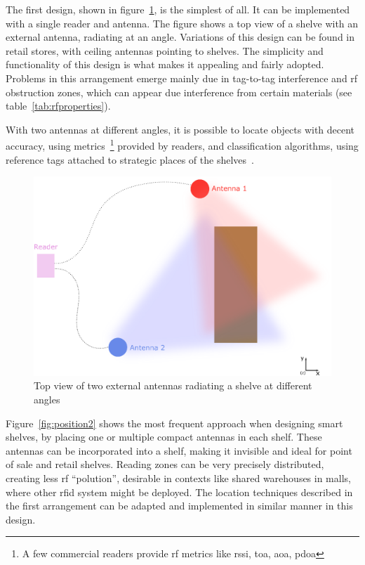 The first design, shown in figure~\ref{fig:position1}, is the simplest of all. It can be implemented with a single reader and antenna. The figure shows a top view of a shelve with an external antenna, radiating at an angle. Variations of this design can be found in retail stores, with ceiling antennas pointing to shelves.
The simplicity and functionality of this design is what makes it appealing and fairly adopted.
Problems in this arrangement emerge mainly due in tag-to-tag interference and \ac{rf} obstruction zones, which can appear due interference from certain materials (see table~\ref{tab:rfproperties}).

With two antennas at different angles, it is possible to locate objects with decent accuracy, using metrics~\footnote{A few commercial readers provide \ac{rf} metrics like \ac{rssi}, \ac{toa}, \ac{aoa}, \ac{pdoa}} provided by readers, and classification algorithms, using reference tags attached to strategic places of the shelves~\cite{dalessandroRFIDBasedSmartShelving2012}.

\begin{figure}[H]
    \centering
    \includegraphics[width=0.7\linewidth]{./figs/02-state-of-the-art/position1.eps}
    \caption{Top view of two external antennas radiating a shelve at different angles}
    \label{fig:position1}
\end{figure}

Figure~\ref{fig:position2} shows the most frequent approach when designing smart shelves, by placing one or multiple compact antennas in each shelf.
These antennas can be incorporated into a shelf, making it invisible and ideal for point of sale and retail shelves.
Reading zones can be very precisely distributed, creating less \ac{rf} ``polution'', desirable in contexts like shared warehouses in malls, where other \ac{rfid} system might be deployed.
The location techniques described in the first arrangement can be adapted and implemented in similar manner in this design.

